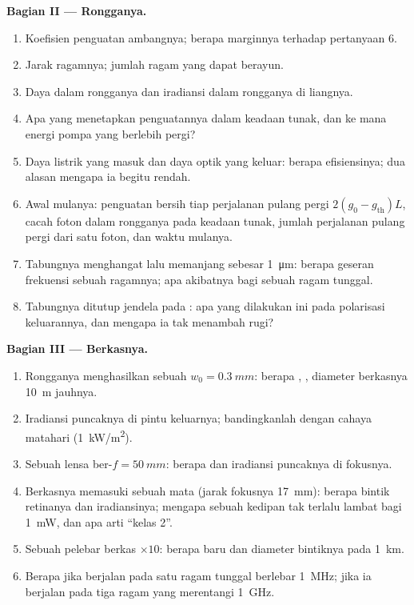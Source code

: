 \begin{problem}
\textbf{Bagian II --- Rongganya.}
\begin{enumerate}[resume]
  \item Koefisien penguatan ambangnya; berapa marginnya terhadap pertanyaan 6.
  \item Jarak ragamnya; jumlah ragam yang dapat berayun.
  \item Daya dalam rongganya dan iradiansi dalam rongganya di liangnya.
  \item Apa yang menetapkan penguatannya dalam keadaan tunak, dan ke mana energi
        pompa yang berlebih pergi?
  \item Daya listrik yang masuk dan daya optik yang keluar: berapa efisiensinya; dua
        alasan mengapa ia begitu rendah.
  \item Awal mulanya: penguatan bersih tiap perjalanan pulang pergi $2(g_0 - g_{\text{th}})L$,
        cacah foton dalam rongganya pada keadaan tunak, jumlah
        perjalanan pulang pergi dari satu foton, dan waktu mulanya.
  \item Tabungnya menghangat lalu memanjang sebesar \qty{1}{\micro m}: berapa geseran
        frekuensi sebuah ragamnya; apa akibatnya bagi sebuah  ragam tunggal.
  \item Tabungnya ditutup jendela pada : apa yang dilakukan
        ini pada polarisasi keluarannya, dan mengapa ia tak
        menambah rugi?
\end{enumerate}

\textbf{Bagian III --- Berkasnya.}
\begin{enumerate}[resume]
  \item Rongganya menghasilkan sebuah  $w_0 = \qty{0.3}{mm}$: berapa , , diameter berkasnya \qty{10}{m} jauhnya.
  \item Iradiansi puncaknya di pintu keluarnya; bandingkanlah dengan cahaya matahari
        (\qty{1}{kW/m^2}).
  \item Sebuah lensa ber-$f = \qty{50}{mm}$: berapa  dan iradiansi puncaknya di
        fokusnya.
  \item Berkasnya memasuki sebuah mata (jarak fokusnya \qty{17}{mm}): berapa bintik retinanya
        dan iradiansinya; mengapa sebuah kedipan tak terlalu lambat bagi \qty{1}{mW},
        dan apa arti ``kelas 2''.
  \item Sebuah pelebar berkas $\times 10$: berapa  baru dan diameter bintiknya
        pada \qty{1}{km}.
  \item Berapa  jika  berjalan pada satu ragam tunggal berlebar
        \qty{1}{MHz}; jika ia berjalan pada tiga ragam yang merentangi \qty{1}{GHz}.
\end{enumerate}


\end{problem}
